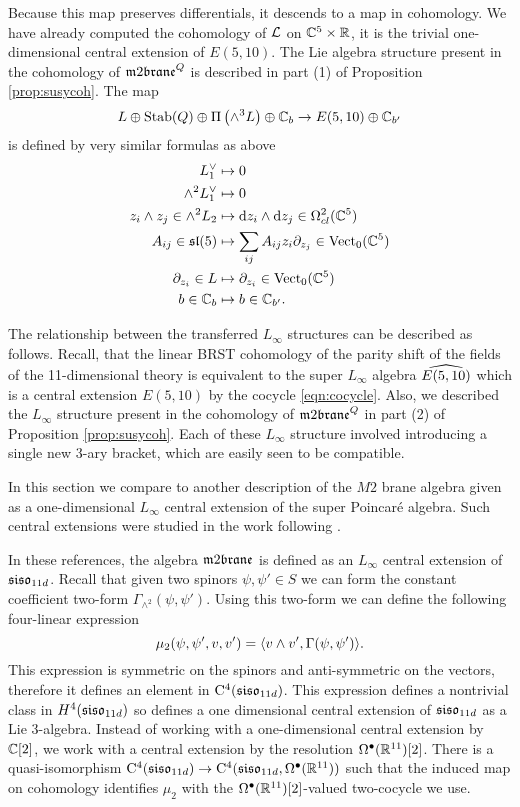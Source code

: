 \parsec[]

Because this map preserves differentials, it descends to a map in cohomology. 
We have already computed the cohomology of $\cL$ on $\CC^5 \times \RR$, it is the trivial one-dimensional central extension of $E (5,10)$. 
The Lie algebra structure present in the cohomology of $\m2^Q$ is described in part (1) of Proposition \ref{prop:susycoh}. 
The map
\[
L \oplus {\rm Stab}(Q) \oplus \Pi \left(\wedge^3 L \right) \oplus \CC_b \to E (5,10) \oplus \CC_{b'}
\]
is defined by very similar formulas as above
\begin{align*}
 L^\vee_1 & \mapsto 0 \\
 \wedge^2 L^\vee_1 & \mapsto 0 \\
z_i \wedge z_j \in \wedge^2 L_2 & \mapsto \d z_i \wedge \d z_j \in \Omega^{2}_{cl} (\CC^5) \\
A_{ij} \in \lie{sl}(5) & \mapsto \sum_{ij} A_{ij} z_i \partial_{z_j} \in \Vect_0(\CC^5) \\ \partial_{z_i} \in L & \mapsto
\partial_{z_i} \in \Vect_0(\CC^5) \\
b \in \CC_b & \mapsto b \in \CC_{b'} .
\end{align*}

The relationship between the transferred $L_\infty$ structures can be described as follows. 
Recall, that the linear BRST cohomology of the parity shift of the fields of the 11-dimensional theory is equivalent to the super $L_\infty$ 
algebra $\Hat{E(5,10)}$ which is a central extension $E(5,10)$ by the cocycle \eqref{eqn:cocycle}.
Also, we described the $L_\infty$ structure present in the cohomology of $\m2^Q$ in part (2) of Proposition \ref{prop:susycoh}. 
Each of these $L_\infty$ structure involved introducing a single new $3$-ary bracket, which are easily seen to be compatible. 

\parsec[]

In this section we compare to another description of the $M2$ brane algebra given as a one-dimensional $L_\infty$ central extension of the super Poincar\'e algebra.
Such central extensions were studied in the work \cite{BHsusyII, SSS, FSS} following \cite{CDF}. 

In these references, the algebra $\m2$ is defined as an $L_\infty$  
central extension of $\lie{siso}_{11d}$. 
Recall that given two spinors $\psi, \psi' \in S$ we can form the constant coefficient two-form $\Gamma_{\wedge^2} (\psi, \psi')$. 
Using this two-form we can define the following four-linear expression
\[
\mu_2 (\psi, \psi',v,v') = \<v \wedge v', \Gamma(\psi, \psi')\> .
\]
This expression is symmetric on the spinors and anti-symmetric on the vectors, therefore it defines an element in $\clie^4(\lie{siso}_{11d})$. 
This expression defines a nontrivial class in $H^4(\lie{siso}_{11d})$ so defines a one dimensional central extension of $\lie{siso}_{11d}$ as a Lie 3-algebra. 
Instead of working with a one-dimensional central extension by $\CC[2]$, we work with a central extension by the resolution $\Omega^\bullet(\RR^{11})[2]$. There is a quasi-isomorphism $\clie^4(\lie{siso}_{11d})\to \clie^4(\lie{siso}_{11d}, \Omega^\bullet (\R^{11}))$ such that the induced map on cohomology identifies $\mu_2$ with the $\Omega^\bullet(\RR^{11})[2]$-valued two-cocycle we use. 

